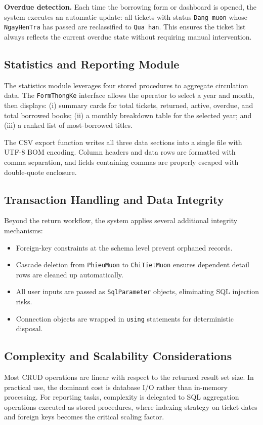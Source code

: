 \documentclass[12pt,a4paper]{article}
\begin{document}
\textbf{Overdue detection.} Each time the borrowing form or dashboard is opened, the system executes an automatic update: all tickets with status \texttt{Dang muon} whose \texttt{NgayHenTra} has passed are reclassified to \texttt{Qua han}. This ensures the ticket list always reflects the current overdue state without requiring manual intervention.

\subsection{Statistics and Reporting Module}
The statistics module leverages four stored procedures to aggregate circulation data. The \texttt{FormThongKe} interface allows the operator to select a year and month, then displays: (i) summary cards for total tickets, returned, active, overdue, and total borrowed books; (ii) a monthly breakdown table for the selected year; and (iii) a ranked list of most-borrowed titles.

The CSV export function writes all three data sections into a single file with UTF-8 BOM encoding. Column headers and data rows are formatted with comma separation, and fields containing commas are properly escaped with double-quote enclosure.

\subsection{Transaction Handling and Data Integrity}
Beyond the return workflow, the system applies several additional integrity mechanisms:
\begin{itemize}[leftmargin=1.5cm]
    \item Foreign-key constraints at the schema level prevent orphaned records.
    \item Cascade deletion from \texttt{PhieuMuon} to \texttt{ChiTietMuon} ensures dependent detail rows are cleaned up automatically.
    \item All user inputs are passed as \texttt{SqlParameter} objects, eliminating SQL injection risks.
    \item Connection objects are wrapped in \texttt{using} statements for deterministic disposal.
\end{itemize}

\subsection{Complexity and Scalability Considerations}
Most CRUD operations are linear with respect to the returned result set size. In practical use, the dominant cost is database I/O rather than in-memory processing. For reporting tasks, complexity is delegated to SQL aggregation operations executed as stored procedures, where indexing strategy on ticket dates and foreign keys becomes the critical scaling factor.
\end{document}
